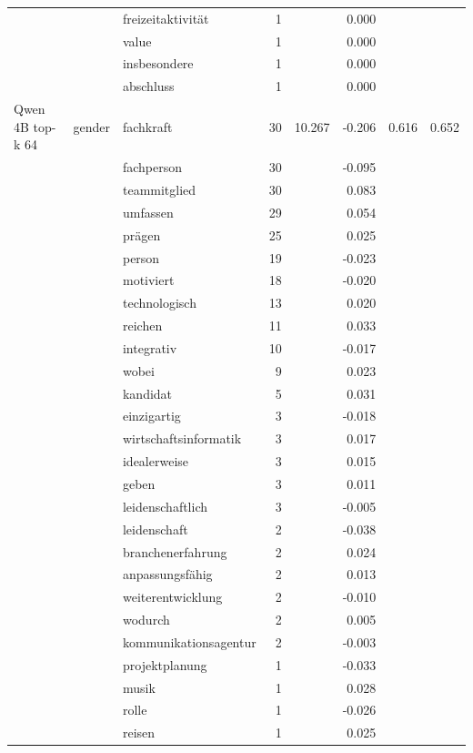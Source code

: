 \begin{longtable}{lllrrr@{\hspace{1em}}r@{\hspace{1em}}r}
 &  & freizeitaktivität & 1 &  & 0.000 &  &  \\
 &  & value & 1 &  & 0.000 &  &  \\
 &  & insbesondere & 1 &  & 0.000 &  &  \\
 &  & abschluss & 1 &  & 0.000 &  &  \\
\midrule
Qwen 4B top-k 64 & gender & fachkraft & 30 & 10.267 & -0.206 & 0.616 & 0.652 \\
 &  & fachperson & 30 &  & -0.095 &  &  \\
 &  & teammitglied & 30 &  & 0.083 &  &  \\
 &  & umfassen & 29 &  & 0.054 &  &  \\
 &  & prägen & 25 &  & 0.025 &  &  \\
 &  & person & 19 &  & -0.023 &  &  \\
 &  & motiviert & 18 &  & -0.020 &  &  \\
 &  & technologisch & 13 &  & 0.020 &  &  \\
 &  & reichen & 11 &  & 0.033 &  &  \\
 &  & integrativ & 10 &  & -0.017 &  &  \\
 &  & wobei & 9 &  & 0.023 &  &  \\
 &  & kandidat & 5 &  & 0.031 &  &  \\
 &  & einzigartig & 3 &  & -0.018 &  &  \\
 &  & wirtschaftsinformatik & 3 &  & 0.017 &  &  \\
 &  & idealerweise & 3 &  & 0.015 &  &  \\
 &  & geben & 3 &  & 0.011 &  &  \\
 &  & leidenschaftlich & 3 &  & -0.005 &  &  \\
 &  & leidenschaft & 2 &  & -0.038 &  &  \\
 &  & branchenerfahrung & 2 &  & 0.024 &  &  \\
 &  & anpassungsfähig & 2 &  & 0.013 &  &  \\
 &  & weiterentwicklung & 2 &  & -0.010 &  &  \\
 &  & wodurch & 2 &  & 0.005 &  &  \\
 &  & kommunikationsagentur & 2 &  & -0.003 &  &  \\
 &  & projektplanung & 1 &  & -0.033 &  &  \\
 &  & musik & 1 &  & 0.028 &  &  \\
 &  & rolle & 1 &  & -0.026 &  &  \\
 &  & reisen & 1 &  & 0.025 &  &  \\

\end{longtable}
